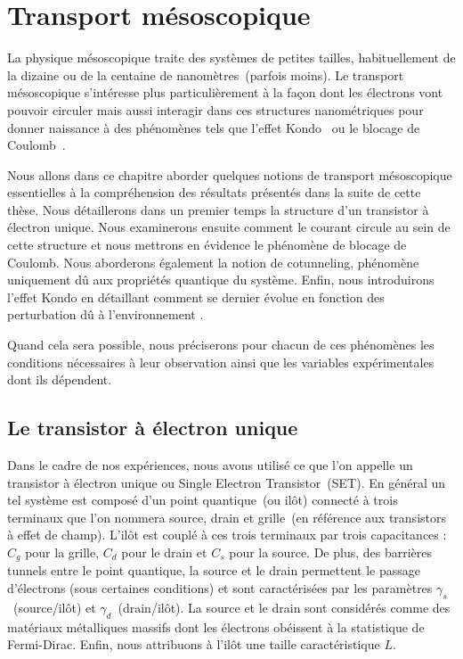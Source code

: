 \chapter{Transport mésoscopique}

La physique mésoscopique traite des systèmes de petites tailles, habituellement de la dizaine ou de la centaine de nanomètres~(parfois moins). Le transport mésoscopique s'intéresse plus particulièrement à la façon dont les électrons vont pouvoir circuler mais aussi interagir dans ces structures nanométriques pour donner naissance à des phénomènes tels que l'effet Kondo~\cite{JKondo1} ou le blocage de Coulomb~\cite{Beenakker1991}. 

Nous allons dans ce chapitre aborder quelques notions de transport mésoscopique essentielles à la compréhension des résultats présentés dans la suite de cette thèse. Nous détaillerons dans un premier temps la structure d'un transistor à électron unique. Nous examinerons ensuite comment le courant circule au sein de cette structure et nous mettrons en évidence le phénomène de blocage de Coulomb. Nous aborderons également la notion de cotunneling, phénomène uniquement dû aux propriétés quantique du système. Enfin, nous introduirons l'effet Kondo en détaillant comment se dernier évolue en fonction des perturbation dû à l'environnement .

Quand cela sera possible, nous préciserons pour chacun de ces phénomènes les conditions nécessaires à leur observation ainsi que les variables expérimentales dont ils dépendent.


\section{Le transistor à électron unique}
Dans le cadre de nos expériences, nous avons utilisé ce que l'on appelle un transistor à électron unique ou Single Electron Transistor~(SET). En général un tel système est composé d'un point quantique~(ou ilôt) connecté à trois terminaux que l'on nommera source, drain et grille~(en référence aux transistors à effet de champ). L'il\^ot est couplé à ces trois terminaux par trois capacitances : $C_g$ pour la grille, $C_d$ pour le drain et $C_s$ pour la source. De plus, des barrières tunnels entre le point quantique, la source et le drain permettent le passage d'électrons (sous certaines conditions) et sont caractérisées par les paramètres $\gamma_s$~(source/il\^ot) et $\gamma_d$~(drain/il\^ot). La source et le drain sont considérés comme des matériaux métalliques massifs dont les électrons obéissent à la statistique de Fermi-Dirac. Enfin, nous attribuons à l'il\^ot une taille caractéristique $L$. 

